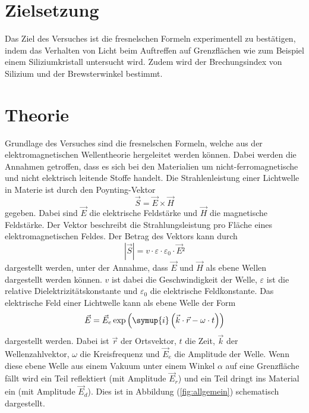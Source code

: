 \section{Zielsetzung}
\label{sec:Zielsetzung}
Das Ziel des Versuches ist die fresnelschen Formeln experimentell zu bestätigen, 
indem das Verhalten von Licht beim Auftreffen auf Grenzflächen wie zum Beispiel einem Siliziumkristall 
untersucht wird. Zudem wird der Brechungsindex von Silizium und der Brewsterwinkel bestimmt. 
\section{Theorie}
\label{sec:Theorie}
Grundlage des Versuches sind die fresnelschen Formeln, welche aus der elektromagnetischen Wellentheorie hergeleitet werden können. 
Dabei werden die Annahmen getroffen, dass es sich bei den Materialien um nicht-ferromagnetische und nicht elektrisch leitende Stoffe handelt. 
Die Strahlenleistung einer Lichtwelle in Materie ist durch den Poynting-Vektor 
\begin{equation}
    \vec{S} = \vec{E} \times \vec{H} 
    \label{eqn:Poyntingvektor}
\end{equation}
gegeben. Dabei sind $\vec{E}$ die elektrische Feldstärke und $\vec{H}$ die magnetische Feldstärke. 
Der Vektor beschreibt die Strahlungsleistung pro Fläche eines elektromagnetischen Feldes. 
Der Betrag des Vektors kann durch 
\begin{equation}
    |\vec{S}| = v \cdot \varepsilon \cdot \varepsilon_0 \cdot \vec{E}²
    \label{eqn:Poyntingbetrag}
\end{equation}
dargestellt werden, unter der Annahme, dass $\vec{E}$ und $\vec{H}$ als ebene Wellen dargestellt werden können. 
$v$ ist dabei die Geschwindigkeit der Welle, $\varepsilon$ ist die relative Dielektrizitätskonstante und $\varepsilon_0$ die elektrische Feldkonstante. 
Das elektrische Feld einer Lichtwelle kann als ebene Welle der Form 
\begin{equation}
    \vec{E} = \vec{E}_e \exp{\left(\symup{i}\left(\vec{k}\cdot \vec{r} - \omega \cdot t\right)\right)}
    \label{eqn:ebene_Welle}
\end{equation}
dargestellt werden. Dabei ist $\vec{r}$ der Ortsvektor, $t$ die Zeit, $\vec{k}$ der Wellenzahlvektor, 
$\omega$ die Kreisfrequenz und $\vec{E}_e$ die Amplitude der Welle. 
Wenn diese ebene Welle aus einem Vakuum unter einem Winkel $\alpha$ auf eine Grenzfläche fällt wird ein Teil reflektiert (mit Amplitude $\vec{E}_r$)
und ein Teil dringt ins Material ein (mit Amplitude $\vec{E}_d$). Dies ist in Abbildung (\ref{fig:allgemein}) schematisch dargestellt. 
